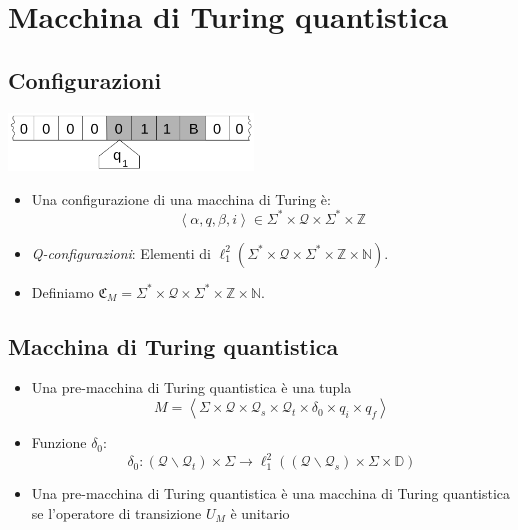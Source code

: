 \documentclass{beamer}
\begin{document}
\section{Macchina di Turing quantistica}

\subsection{Configurazioni}

\begin{frame}{\subsecname}{}
	\centering\includegraphics[width=6.5cm]{Turing_machine_2b.svg.png}
	\begin{itemize}
		\item Una configurazione di una macchina di Turing è:
		\[ \left \langle \alpha, q, \beta, i \right \rangle \in \Sigma^{*} \times \mathcal{Q} \times \Sigma^{*} \times \mathbb{Z} \]
		\item \textit{Q-configurazioni}: Elementi di \( \ell^{2}_{1} \left ( \Sigma^{*} \times \mathcal{Q} \times \Sigma^{*} \times \mathbb{Z} \times \mathbb{N} \right ) \).
		\item Definiamo \( \mathfrak{C}_M = \Sigma^{*} \times \mathcal{Q} \times \Sigma^{*} \times \mathbb{Z} \times \mathbb{N} \).
	\end{itemize}
\end{frame}

\subsection{Macchina di Turing quantistica}

\begin{frame}{\subsecname}{}
	\begin{itemize}
		\item Una pre-macchina di Turing quantistica è una tupla
		\[ M = \left \langle \Sigma \times \mathcal{Q} \times \mathcal{Q}_{s} \times \mathcal{Q}_{t} \times \delta_{0} \times q_{i} \times q_{f} \right \rangle \]
		\item Funzione \(\delta_{0}\):
		\[ \delta_{0} : \left ( \mathcal{Q} \backslash \mathcal{Q}_{t} \right ) \times \Sigma \rightarrow \ell^{2}_{1} \left ( \left ( \mathcal{Q} \backslash \mathcal{Q}_{s} \right ) \times \Sigma \times \mathbb{D} \right ) \]
		\item Una pre-macchina di Turing quantistica è una macchina di Turing quantistica se l'operatore di transizione \( U_{M} \) è unitario
	\end{itemize}
\end{frame}
\end{document}
